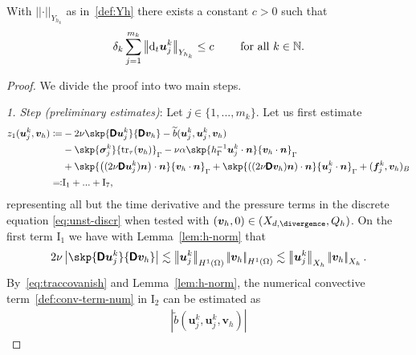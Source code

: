\documentclass[reqno,a4paper]{amsart}
\def\abs#1{\left| #1 \right|}
\def\norm#1{\left|\!\left| #1 \right|\!\right|}
\def\tens#1{\pmb{\mathsf{#1}}}
\def\vec#1{\boldsymbol{#1}}
\def\tr{\mathop{\mathrm{tr}}\nolimits}
\def\d{{\rm d}}
\def\difft{\d_t}
\def\bf{\vec{f}}
\def\bn{\vec{n}}
\def\bu{\vec{u}}
\def\bv{\vec{v}}
\def\bsigma{\vec{\sigma}}
\def\BD{\tens{D}}
\def\wz{{z_1}}
\begin{document}
\begin{lemma}\label{lem:dt-est} 
	With $ \norm{\cdot}_{Y_{h_k}}$ as in~\eqref{def:Yh} there exists a constant $c>0$ such that 
	\begin{align}\label{def:sigma-k}
		\delta_k\sum_{j = 1}^{m_k} \norm{\difft {\bu}^k_j}_{Y_{h_k}}  
		\leq c \qquad \text{ for all } k \in \mathbb{N}. 
	\end{align}
\end{lemma}
\begin{proof}
	We divide the proof into two main steps.
	
	\textit{1. Step (preliminary estimates)}: 
	Let $j\in\{1,...,m_{k}\}$. 
	Let us first estimate 
	\begin{equation}
		\begin{aligned}\label{def:z-form}
			\wz(\bu^k_j, \bv_h) \coloneqq & 
			- 2\nu \skp{ \BD \bu^{k}_j}{ \BD \bv_h } 
			- \widetilde{b}(\bu^{k}_j, \bu^{k}_j, \bv_h)
			\\
			& 
			- \skp{\bsigma^k_j
			}{\tr_{\tau}(\bv_h) }_{\Gamma}
			-   \nu \alpha \skp{ h_{\Gamma}^{-1} \bu^{k}_j \cdot \bn}{  \bv_h \cdot \bn}_{\Gamma}
			\\ 
			& 
			+ \skp{ \left( (2\nu  \BD \bu_j^{k}) \bn \right) \cdot \bn }{ \bv_h \cdot \bn }_{\Gamma}
			+ \skp{   \left((2 \nu \BD \bv_h) \bn \right) \cdot \bn }{ \bu_j^{k} \cdot \bn }_{\Gamma}
			+ ({\bf}_j^{k} ,{\bv}_h )_B \\ 
			 \eqqcolon & \mathrm{I}_{1}+...+\mathrm{I}_{7},
		\end{aligned}
	\end{equation}
	representing all but the time derivative and the pressure terms in the discrete equation \eqref{eq:unst-discr} when tested with $(\bv_h, 0) \in (X_{d,\divergence},Q_h)$. 
	On the first term $\mathrm{I}_{1}$ we have with Lemma~\ref{lem:h-norm} that
	\begin{align}\label{eq:unst-incr-2}
		2 \nu \abs{\skp{ \BD \bu^{k}_j}{ \BD \bv_h }} 
		\lesssim 
		\norm{\bu_j^k}_{H^1(\Omega)} \norm{\bv_h}_{H^1(\Omega)} 
		\lesssim 
		\norm{ \bu_j^k}_{X_h} \norm{ \bv_h}_{X_h}. 
	\end{align}
	By~\eqref{eq:traccovanish} and Lemma~\ref{lem:h-norm}, the numerical convective term~\eqref{def:conv-term-num} in $\mathrm{I}_{2}$   can be estimated as
	\begin{equation}\label{eq:unst-incr-3}
		\begin{aligned}
			\abs{ \widetilde b(\bu^k_j,\bu^k_j,\bv_h)}

\end{aligned}
\end{equation}
\end{proof}
\end{document}
